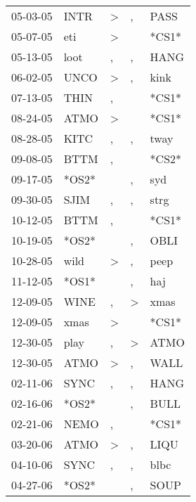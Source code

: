 \begin{supertabular}{lllll}
 05-03-05 &   INTR &     \textgreater &                , &   PASS \\
 05-07-05 &    eti &     \textgreater &                  &  *CS1* \\
 05-13-05 &   loot &                , &                , &   HANG \\
 06-02-05 &   UNCO &     \textgreater &                , &   kink \\
 07-13-05 &   THIN &                , &                  &  *CS1* \\
 08-24-05 &   ATMO &     \textgreater &                  &  *CS1* \\
 08-28-05 &   KITC &                , &                , &   tway \\
 09-08-05 &   BTTM &                , &                  &  *CS2* \\
 09-17-05 &  *OS2* &                  &                , &    syd \\
 09-30-05 &   SJIM &                , &                , &   strg \\
 10-12-05 &   BTTM &                , &                  &  *CS1* \\
 10-19-05 &  *OS2* &                  &                , &   OBLI \\
 10-28-05 &   wild &     \textgreater &                , &   peep \\
 11-12-05 &  *OS1* &                  &                , &    haj \\
 12-09-05 &   WINE &                , &     \textgreater &   xmas \\
 12-09-05 &   xmas &     \textgreater &                  &  *CS1* \\
 12-30-05 &   play &                , &     \textgreater &   ATMO \\
 12-30-05 &   ATMO &     \textgreater &                , &   WALL \\
 02-11-06 &   SYNC &                , &                , &   HANG \\
 02-16-06 &  *OS2* &                  &                , &   BULL \\
 02-21-06 &   NEMO &                , &                  &  *CS1* \\
 03-20-06 &   ATMO &     \textgreater &                , &   LIQU \\
 04-10-06 &   SYNC &                , &                , &   blbc \\
 04-27-06 &  *OS2* &                  &                , &   SOUP \\

\end{supertabular}
